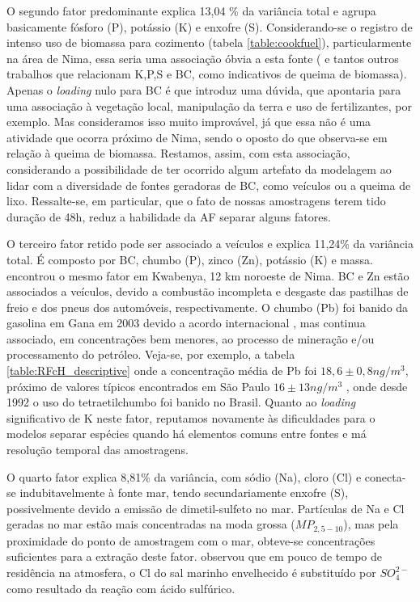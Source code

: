 O segundo fator predominante explica 13,04 \% da variância total e agrupa 
basicamente fósforo (P), potássio (K) e enxofre (S). Considerando-se o registro
de intenso uso de biomassa para cozimento (tabela \ref{table:cookfuel}), 
particularmente na área de Nima, essa seria uma associação óbvia a esta fonte
(\citet{reid2005} e tantos outros trabalhos que relacionam K,P,S e BC, 
como indicativos de queima de biomassa). Apenas o \textit{loading} nulo para BC 
é que introduz uma dúvida, que apontaria para uma associação à vegetação local, 
manipulação da terra e uso de fertilizantes, por exemplo. Mas consideramos isso 
muito improvável, já que essa não é uma atividade que ocorra próximo de Nima, 
sendo o oposto do que observa-se em relação à queima de biomassa. Restamos, 
assim, com esta associação, considerando a possibilidade de ter ocorrido algum 
artefato da modelagem ao lidar com a diversidade de fontes geradoras de BC, 
como veículos ou a queima de lixo. Ressalte-se, em particular, que o fato de 
nossas amostragens terem tido duração de 48h, reduz a habilidade da AF separar 
alguns fatores.

O terceiro fator retido pode ser associado a veículos e explica 11,24\% da 
variância total. É composto por BC, chumbo (P), zinco (Zn), potássio (K) e 
massa. \citet{aboh2009} encontrou o mesmo fator em Kwabenya, 12 km noroeste de 
Nima. BC e Zn estão associados a veículos, devido a combustão incompleta e 
desgaste das pastilhas de freio e dos pneus dos automóveis, respectivamente. 
O chumbo (Pb) foi banido da gasolina em Gana em 2003 devido a acordo 
internacional \citep{epa2015}, mas continua associado, em concentrações bem 
menores, ao processo de mineração e/ou processamento do petróleo. 
Veja-se, por exemplo, a tabela \ref{table:RFcH_descriptive} onde a concentração 
média de Pb foi $18,6 \pm 0,8 n g /m^3$, próximo de valores típicos encontrados 
em São Paulo $16 \pm 13 n g /m^3$ \citep{andrade2012}, onde desde 1992 o uso do 
tetraetilchumbo foi banido no Brasil. Quanto ao \textit{loading} significativo 
de K neste fator, reputamos novamente às dificuldades para o modelos separar 
espécies quando há elementos comuns entre fontes e má resolução temporal das 
amostragens.

O quarto fator explica 8,81\% da variância, com sódio (Na), cloro (Cl) e
conecta-se indubitavelmente à fonte mar, tendo secundariamente enxofre (S), 
possivelmente devido a emissão de dimetil-sulfeto no mar.
Partículas de Na e Cl geradas no mar estão mais concentradas na moda grossa 
($MP_{2,5-10}$), mas pela proximidade do ponto de amostragem com o mar, 
obteve-se concentrações suficientes para a extração deste fator. 
\citet{mcinnes1994} observou que em pouco de tempo de residência na atmosfera, 
o Cl do sal marinho envelhecido é substituído por $SO_4^{2-}$ como resultado 
da reação com ácido sulfúrico.

